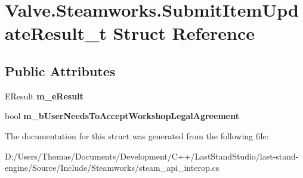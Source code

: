 \hypertarget{structValve_1_1Steamworks_1_1SubmitItemUpdateResult__t}{}\section{Valve.\+Steamworks.\+Submit\+Item\+Update\+Result\+\_\+t Struct Reference}
\label{structValve_1_1Steamworks_1_1SubmitItemUpdateResult__t}
\subsection*{Public Attributes}
\begin{DoxyCompactItemize}
\item 
\hypertarget{structValve_1_1Steamworks_1_1SubmitItemUpdateResult__t_ab577dbed62ff0acac6fccff9d90255ba}{}E\+Result {\bfseries m\+\_\+e\+Result}\label{structValve_1_1Steamworks_1_1SubmitItemUpdateResult__t_ab577dbed62ff0acac6fccff9d90255ba}

\item 
\hypertarget{structValve_1_1Steamworks_1_1SubmitItemUpdateResult__t_a0326b0636f48a3653025bc1537019bfe}{}bool {\bfseries m\+\_\+b\+User\+Needs\+To\+Accept\+Workshop\+Legal\+Agreement}\label{structValve_1_1Steamworks_1_1SubmitItemUpdateResult__t_a0326b0636f48a3653025bc1537019bfe}

\end{DoxyCompactItemize}


The documentation for this struct was generated from the following file\+:\begin{DoxyCompactItemize}
\item 
D\+:/\+Users/\+Thomas/\+Documents/\+Development/\+C++/\+Last\+Stand\+Studio/last-\/stand-\/engine/\+Source/\+Include/\+Steamworks/steam\+\_\+api\+\_\+interop.\+cs\end{DoxyCompactItemize}
